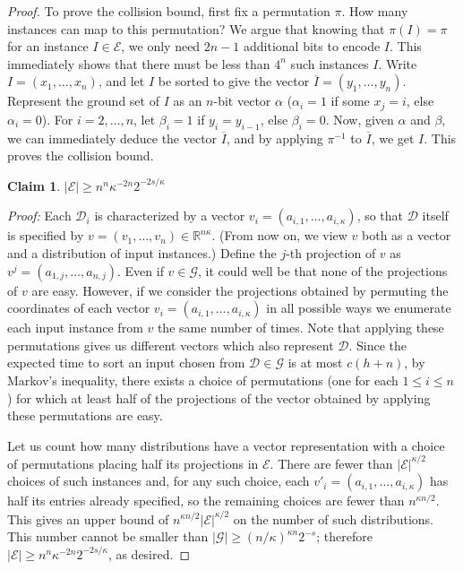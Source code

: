 \documentclass{siamltex}
\newcommand{\D}{\mathcal{D}}
\newcommand{\cE}{\mathcal{E}}
\newcommand{\cG}{\mathcal{G}}
\newcommand{\R}{\mathbb R}
\newtheorem{claim}[theorem]{Claim}
\begin{document}
\begin{proof}
To prove the collision bound, first fix a permutation $\pi$. How many
instances can map to this permutation? We argue 
that knowing that $\pi(I) = \pi$ for 
an instance $I \in \cE$, we only need
$2n-1$ additional bits to encode $I$. This immediately
shows that there must be less than $4^n$ such instances $I$.
Write $I = (x_1,\ldots, x_n)$,
and let $I$ be sorted to give the vector $\overline{I} = (y_1,\ldots, y_n)$.
Represent the ground set of $I$ as an $n$-bit vector $\alpha$
($\alpha_i = 1$ if some $x_j = i$, else $\alpha_i = 0$).
For $i= 2,\ldots, n$, let $\beta_i = 1$ if $y_i = y_{i-1}$,
else $\beta_i = 0$. Now, given $\alpha$ and $\beta$, we can immediately
deduce the vector $\overline{I}$, and by applying $\pi^{-1}$ to 
$\overline{I}$, we get $I$.
This proves the collision bound.
\qquad \endproof
\smallskip
\begin{claim} \label{clm:E-lower} 
$|{\cE}| \geq n^n \kappa^{-2n} 2^{-2s/\kappa}$
\end{claim} 

\emph{Proof:} 
Each $\D_i$ is characterized by a vector 
$v_i=(a_{i,1},\ldots,a_{i,\kappa})$, so that 
$\D$ itself is specified by 
$v= (v_1,\ldots, v_n)\in \R^{n\kappa}$. (From now on,
we view $v$ both as a vector and a distribution of input instances.)
Define the $j$-th projection of $v$ as $v^j=(a_{1,j},\ldots, a_{n,j})$.
Even if $v\in {\cG}$, 
it could well be that none of the 
projections of $v$ are easy. However, if we consider
the projections obtained by permuting the coordinates
of each vector $v_i=(a_{i,1},\ldots,a_{i,\kappa})$ in all possible
ways we enumerate each input instance from $v$ 
the same number of times. 
Note that applying these permutations gives us different vectors which also 
represent $\D$.
Since the expected time to sort an input chosen from $\D\in {\cG}$
is at most $c(h+n)$,
by Markov's inequality, there exists a choice of permutations 
(one for each $1 \leq i \leq n$) for which at least half of 
the projections of the vector obtained by applying these permutations are easy. 

Let us count how many distributions have a vector representation with a choice
of permutations placing half its projections in $\cE$.
There are fewer than $|{\cE}|^{\kappa /2}$
choices of such instances and, for any such choice, 
each $v'_i=(a_{i,1},\ldots,a_{i,\kappa})$ has half its entries
already specified, so the remaining choices are fewer
than $n^{\kappa n/2}$. This gives an upper bound of 
$n^{\kappa n/2} |{\cE}|^{\kappa/2}$ on the number of such distributions.
This number cannot be smaller than 
$|{\cG}| \geq (n/\kappa)^{\kappa n}2^{-s}$; therefore
$|{\cE}| \geq n^n \kappa^{-2n} 2^{-2s/\kappa}$, as desired. \qquad \endproof
\medskip


\end{proof}
\end{document}
